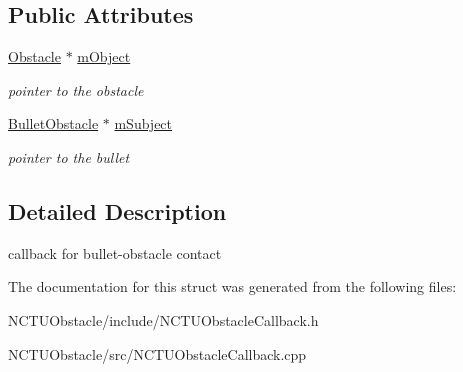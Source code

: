 \subsection*{Public Attributes}
\begin{DoxyCompactItemize}
\item 
\hyperlink{class_n_c_t_u_1_1_obstacle}{Obstacle} $\ast$ \hyperlink{struct_n_c_t_u_1_1_bullet_contact_result_callback_a4b87f68a3e61872f1cfeb8e8b45d7933}{m\+Object}\hypertarget{struct_n_c_t_u_1_1_bullet_contact_result_callback_a4b87f68a3e61872f1cfeb8e8b45d7933}{}\label{struct_n_c_t_u_1_1_bullet_contact_result_callback_a4b87f68a3e61872f1cfeb8e8b45d7933}

\begin{DoxyCompactList}\small\item\em pointer to the obstacle \end{DoxyCompactList}\item 
\hyperlink{class_n_c_t_u_1_1_bullet_obstacle}{Bullet\+Obstacle} $\ast$ \hyperlink{struct_n_c_t_u_1_1_bullet_contact_result_callback_a352bd10d219aeb087061f93d65bb3618}{m\+Subject}\hypertarget{struct_n_c_t_u_1_1_bullet_contact_result_callback_a352bd10d219aeb087061f93d65bb3618}{}\label{struct_n_c_t_u_1_1_bullet_contact_result_callback_a352bd10d219aeb087061f93d65bb3618}

\begin{DoxyCompactList}\small\item\em pointer to the bullet \end{DoxyCompactList}\end{DoxyCompactItemize}


\subsection{Detailed Description}
callback for bullet-\/obstacle contact 

The documentation for this struct was generated from the following files\+:\begin{DoxyCompactItemize}
\item 
N\+C\+T\+U\+Obstacle/include/N\+C\+T\+U\+Obstacle\+Callback.\+h\item 
N\+C\+T\+U\+Obstacle/src/N\+C\+T\+U\+Obstacle\+Callback.\+cpp\end{DoxyCompactItemize}
